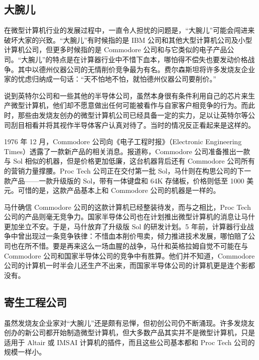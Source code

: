 \documentclass[12pt,UTF8]{ctexbook}
\begin{document}
\subsection{大腕儿}


在微型计算机行业的发展过程中，一直令人担忧的问题是，“大腕儿”可能会闯进来破坏大家的兴致。“大腕儿”有时候指的是 IBM 公司和其他大型计算机公司及小型计算机公司，但更多时候指的是 Commodore 公司和与它类似的电子产品公司。“大腕儿”的特点是在计算器行业中不惜下血本，哪怕得不偿失也要发动价格战争。其中以德州仪器公司的无情削价竞争最为有名。费尔森斯坦将许多发烧友企业家的忧虑归纳成一句话：“天不怕地不怕，就怕德州仪器公司要削价。”

说到英特尔公司和一些其他的半导体公司，虽然本身很有条件利用自己的芯片来生产微型计算机，他们却不愿意做出任何可能被看作与自家客户相竞争的行为。而此时，那些由发烧友创办的微型计算机公司已经具备一定的实力，足以让英特尔等公司刮目相看并将其视作半导体客户认真对待了。当时的情况反正看起来是这样的。

1976 年 12 月，Commodore 公司向《电子工程时报》（Electronic Engineering Times）透露了一款新产品的相关消息。报道称，Commodore 公司准备推出一款与 Sol 相似的机器，但是价格更加低廉，这台机器背后还有 Commodore 公司所有的营销力量撑腰。Proc Tech 公司正在交付第一批 Sol，马什则在构思公司的下一款产品——一款升级版的 Sol，带有一体键盘和 64K 存储板，价格则低至 1000 美元。可惜的是，这款产品基本上和 Commodore 公司的机器是一样的。

马什确信 Commodore 公司的这款计算机已经整装待发，而与之相比，Proc Tech 公司的产品则毫无竞争力。国家半导体公司也在计划推出微型计算机的消息让马什更加坐立不安。于是，马什放弃了升级版 Sol 的研发计划。5 年前，计算器行业战争中曾出现过一条竞争铁律：不惜血本削价甩卖，倾力推进技术发展，哪怕赔了公司也在所不惜。要是再来这么一场血腥的战争，马什和英格拉姆自觉不可能在与 Commodore 公司和国家半导体公司的竞争中有胜算。他们并不知道，Commodore 公司的计算机一时半会儿还生产不出来，而国家半导体公司的计算机更是连个影都没有。





\subsection{寄生工程公司}


虽然发烧友企业家对“大腕儿”还是颇有忌惮，但初创公司仍不断涌现。许多发烧友创办的新公司都开始制造微型计算机，但大多数产品其实并不是微型计算机，只是适用于 Altair 或 IMSAI 计算机的插件，而且这些公司基本都和 Proc Tech 公司的规模一样小。
\end{document}
